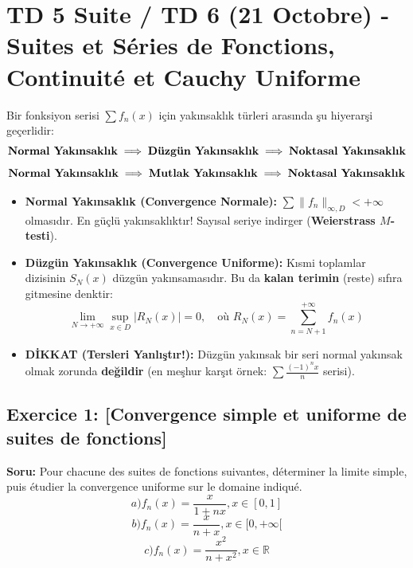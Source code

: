 \documentclass[12pt,a4paper]{report}
\begin{document}
\section{TD 5 Suite / TD 6 (21 Octobre) - Suites et Séries de Fonctions, Continuité et Cauchy Uniforme}

\begin{tcolorbox}[colback=green!5!white,colframe=green!60!black,title=Temel Teori: Fonksiyon Serilerinde Yakınsaklık Hiyerarşisi (Séries de Fonctions)]
Bir fonksiyon serisi $\sum f_n(x)$ için yakınsaklık türleri arasında şu hiyerarşi geçerlidir:
\[ \text{\textbf{Normal Yakınsaklık}} \implies \text{\textbf{Düzgün Yakınsaklık}} \implies \text{\textbf{Noktasal Yakınsaklık}} \]
\[ \text{\textbf{Normal Yakınsaklık}} \implies \text{\textbf{Mutlak Yakınsaklık}} \implies \text{\textbf{Noktasal Yakınsaklık}} \]
\begin{itemize}
    \item \textbf{Normal Yakınsaklık (Convergence Normale):} $\sum \|f_n\|_{\infty, D} < +\infty$ olmasıdır. En güçlü yakınsaklıktır! Sayısal seriye indirger (\textbf{Weierstrass $M$-testi}).
    \item \textbf{Düzgün Yakınsaklık (Convergence Uniforme):} Kısmi toplamlar dizisinin $S_N(x)$ düzgün yakınsamasıdır. Bu da \textbf{kalan terimin} (reste) sıfıra gitmesine denktir:
    \[ \lim_{N \to +\infty} \sup_{x \in D} |R_N(x)| = 0, \quad \text{où } R_N(x) = \sum_{n=N+1}^{+\infty} f_n(x) \]
    \item \textbf{DİKKAT (Tersleri Yanlıştır!):} Düzgün yakınsak bir seri normal yakınsak olmak zorunda \textbf{değildir} (en meşhur karşıt örnek: $\sum \frac{(-1)^n x}{n}$ serisi).
\end{itemize}
\end{tcolorbox}

\subsection*{Exercice 1: [Convergence simple et uniforme de suites de fonctions]}

\textbf{Soru:}
Pour chacune des suites de fonctions suivantes, déterminer la limite simple, puis étudier la convergence uniforme sur le domaine indiqué.
\[ a) f_n(x) = \frac{x}{1+nx}, x \in [0, 1] \]
\[ b) f_n(x) = \frac{x}{n+x}, x \in [0, +\infty[ \]
\[ c) f_n(x) = \frac{x^2}{n+x^2}, x \in \mathbb{R} \]
\end{document}
